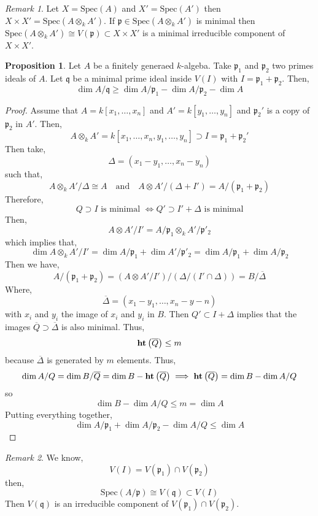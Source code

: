 \documentclass[12pt]{article}
\newcommand{\Spec}[1]{\mathrm{Spec}\left( #1 \right)}
\newcommand{\p}{\mathfrak{p}}
\newcommand{\q}{\mathfrak{q}}
\theoremstyle{remark}
\newtheorem*{remark}{Remark}
\theoremstyle{definition}
\newtheorem{proposition}[theorem]{Proposition}
\begin{document}
\begin{remark}
Let $X = \Spec{A}$ and $X' = \Spec{A'}$ then $X \times X' = \Spec{A \otimes_k A'}$. If $\p \in \Spec{A \otimes_k A'}$ is minimal then $\Spec{A \otimes_k A'} \cong V(\p) \subset X \times X'$ is a minimal irreducible component of $X \times X'$.  
\end{remark}

\begin{proposition}
Let $A$ be a finitely generaed $k$-algeba. Take $\p_1$ and $\p_2$ two primes ideals of $A$. Let $\q$ be a minimal prime ideal inside $V(I)$ with $I = \p_1 + \p_2$. Then,
\[ \dim{A / \q} \ge \dim{A / \p_1} - \dim{A / \p_2} - \dim{A} \]
\end{proposition}

\begin{proof}
Assume that $A = k[x_1, \dots, x_n]$ and $A' = k[y_1, \dots, y_n]$ and $\p_2'$ is a copy of $\p_2$ in $A'$. Then,
\[ A \otimes_k A' = k[x_1, \dots, x_n, y_1, \dots, y_n] \supset I = \p_1 + \p_2' \]
Then take,
\[ \Delta = (x_1 - y_1, \dots, x_n - y_n) \]
such that,
\[ A \otimes_k A' / \Delta \cong A \quad \text{and} \quad A \otimes A' / (\Delta + I') = A / (\p_1 + \p_2) \]
Therefore,
\[ Q \supset I \text{ is minimal } \iff Q' \supset I' + \Delta \text{ is minimal} \]
Then,
\[ A \otimes A' / I' = A / \p_1 \otimes_k A' / \p'_2 \]
which implies that,
\[ \dim{ A \otimes_k A' / I' } = \dim{A / \p_1} + \dim{A' / \p'_2} = \dim{A / \p_1} + \dim{A / \p_2} \]
Then we have, 
\[ A / (\p_1 + \p_2) = (A \otimes A' / I') / (\Delta / (I' \cap \Delta)) = B / \overline{\Delta} \]
Where,
\[ \overline{\Delta} = (x_1 - y_1, \dots, x_n - y-n) \]
with $x_i$ and $y_i$ the image of $x_i$ and $y_i$ in $B$. Then $Q' \subset I + \Delta$ implies that the images $\overline{Q} \supset \overline{\Delta}$ is also minimal. Thus,
\[ \mathbf{ht}\left( \overline{Q} \right) \le m \]
because $\overline{\Delta}$ is generated by $m$ elements. Thus,
\[ \dim{A / Q} = \dim{B / \overline{Q}} = \dim{B} - \mathbf{ht}\left( \overline{Q} \right) \implies \mathbf{ht}\left( \overline{Q} \right) = \dim{B} - \dim{A / Q} \]
so
\[ \dim{B} - \dim{A / Q} \le m = \dim{A} \]
Putting everything together,
\[ \dim{A / \p_1} + \dim{A / \p_2} - \dim{A / Q} \le \dim{A} \]
\end{proof}

\begin{remark}
We know,
\[ V(I) = V(\p_1) \cap V(\p_2) \]
then,
\[ \Spec{A / \p} \cong V(\q) \subset V(I) \]
Then $V(\q)$ is an irreducible component of $V(\p_1) \cap V(\p_2)$. 
\end{remark}
\end{document}
